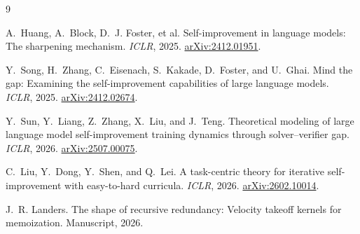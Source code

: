 \documentclass[10pt,twocolumn]{article}
\begin{document}
\begin{thebibliography}{9}\footnotesize

A.~Huang, A.~Block, D.~J. Foster, et al.
\newblock Self-improvement in language models: The sharpening mechanism.
\newblock \emph{ICLR}, 2025. \href{https://arxiv.org/abs/2412.01951}{arXiv:2412.01951}.

Y.~Song, H.~Zhang, C.~Eisenach, S.~Kakade, D.~Foster, and U.~Ghai.
\newblock Mind the gap: Examining the self-improvement capabilities of large language models.
\newblock \emph{ICLR}, 2025. \href{https://arxiv.org/abs/2412.02674}{arXiv:2412.02674}.

Y.~Sun, Y.~Liang, Z.~Zhang, X.~Liu, and J.~Teng.
\newblock Theoretical modeling of large language model self-improvement training dynamics through solver--verifier gap.
\newblock \emph{ICLR}, 2026. \href{https://arxiv.org/abs/2507.00075}{arXiv:2507.00075}.

C.~Liu, Y.~Dong, Y.~Shen, and Q.~Lei.
\newblock A task-centric theory for iterative self-improvement with easy-to-hard curricula.
\newblock \emph{ICLR}, 2026. \href{https://arxiv.org/abs/2602.10014}{arXiv:2602.10014}.

J.~R. Landers.
\newblock The shape of recursive redundancy: Velocity takeoff kernels for memoization.
\newblock Manuscript, 2026.

\end{thebibliography}
\end{document}
